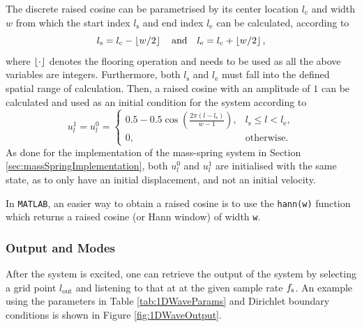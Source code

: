 The discrete raised cosine can be parametrised by its center location $l_\text{c}$ and width $w$ from which the start index $l_\text{s}$ and end index $l_\text{e}$ can be calculated, according to 
\begin{equation}
    l_\text{s} = l_\text{c} - \floor[w/2]\qaq l_\text{e} = l_\text{c} + \floor[w/2],
\end{equation}
where $\floor[\cdot]$ denotes the flooring operation and needs to be used as all the above variables are integers. Furthermore, both $l_\text{s}$ and $l_\text{e}$ must fall into the defined spatial range of calculation. Then, a raised cosine with an amplitude of $1$ can be calculated and used as an initial condition for the system according to
\begin{equation}\label{eq:raisedCos}
    u_l^1 = u_l^0 =
    \begin{cases}
        0.5 - 0.5\cos\left(\frac{2\pi (l - l_\text{s})}{w - 1}\right), & l_\text{s} \leq l < l_\text{e},\\
        0, & \text{otherwise}.
    \end{cases}
\end{equation}
As done for the implementation of the mass-spring system in Section \ref{sec:massSpringImplementation}, both $u_l^0$ and $u^1_l$ are initialised with the same state, as to only have an initial displacement, and not an initial velocity. 

In \texttt{MATLAB}, an easier way to obtain a raised cosine is to use the \texttt{hann(w)} function which returns a raised cosine (or Hann window) of width \texttt{w}.

\subsubsection{Output and Modes}
After the system is excited, one can retrieve the output of the system by selecting a grid point $l_\text{out}$ and listening to that at at the given sample rate $f_\text{s}$. An example using the parameters in Table \ref{tab:1DWaveParams} and Dirichlet boundary conditions is shown in Figure \ref{fig:1DWaveOutput}.

